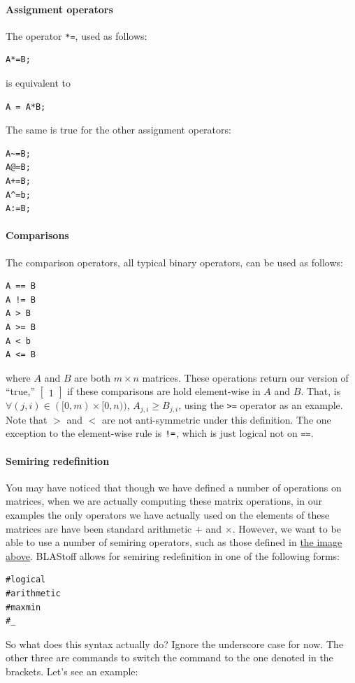 \paragraph{Assignment operators}
The operator \verb|*=|, used as follows:
\begin{lstlisting}
A*=B;
\end{lstlisting}
is equivalent to
\begin{lstlisting}
A = A*B;
\end{lstlisting}
The same is true for the other assignment operators:
\begin{lstlisting}
A~=B;
A@=B;
A+=B;
A^=b;
A:=B;
\end{lstlisting}


\paragraph{Comparisons}

The comparison operators, all typical binary operators,  can be used as follows:\begin{lstlisting}
A == B
A != B
A > B
A >= B
A < b
A <= B
\end{lstlisting}
where $A$ and $B$ are both $m\times n$ matrices.  These operations return our version of ``true,'' $\begin{bmatrix}1\end{bmatrix}$ if these comparisons are hold element-wise in $A$ and $B$.  That, is $\forall (j,i) \in ([0,m) \times [0, n))$, $A_{j,i} \geq B_{j,i}$, using the \verb|>=| operator as an example.  Note that $>$ and $<$ are not anti-symmetric under this definition.
The one exception to the element-wise rule is $\verb|!=|$, which is just logical not on \verb|==|.

\paragraph{Semiring redefinition}
You may have noticed that though we have defined a number of operations on matrices, when we are actually computing these matrix operations, in our examples the only operators we have actually used on the elements of these matrices are have been standard arithmetic $+$ and $\times$.  However, we want to be able to use a number of semiring operators, such as those defined in \hyperref[sec:semirings]{the image above}.  BLAStoff allows for semiring redefinition in one of the following forms:
\begin{lstlisting}
#logical
#arithmetic
#maxmin
#_
\end{lstlisting}
So what does this syntax actually do?  Ignore the underscore case for now.  The other three are commands to switch the command to the one denoted in the brackets.  Let's see an example:

